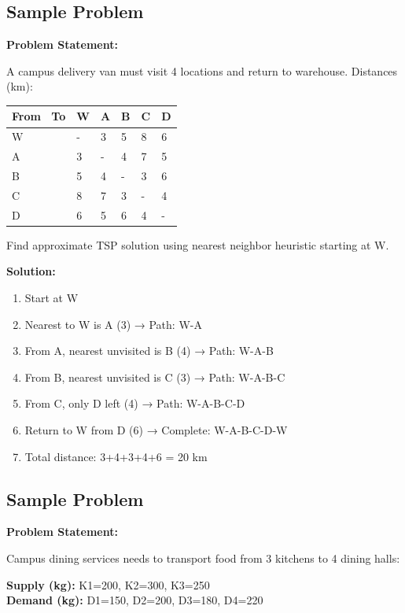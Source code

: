 \documentclass[
  letterpaper,
  DIV=11,
  numbers=noendperiod]{scrreprt}
\providecommand{\tightlist}{%
  \setlength{\itemsep}{0pt}\setlength{\parskip}{0pt}}
\begin{document}
\subsection{Sample Problem}\label{sample-problem-15}

\textbf{Problem Statement:}

A campus delivery van must visit 4 locations and return to warehouse.
Distances (km):

\begin{longtable}[]{@{}llllll@{}}
\toprule\noalign{}
From ~To & W & A & B & C & D \\
\midrule\noalign{}
\endhead
\bottomrule\noalign{}
\endlastfoot
W & - & 3 & 5 & 8 & 6 \\
A & 3 & - & 4 & 7 & 5 \\
B & 5 & 4 & - & 3 & 6 \\
C & 8 & 7 & 3 & - & 4 \\
D & 6 & 5 & 6 & 4 & - \\
\end{longtable}

Find approximate TSP solution using nearest neighbor heuristic starting
at W.

\textbf{Solution:}

\begin{enumerate}
\def\labelenumi{\arabic{enumi}.}
\tightlist
\item
  Start at W
\item
  Nearest to W is A (3) → Path: W-A
\item
  From A, nearest unvisited is B (4) → Path: W-A-B
\item
  From B, nearest unvisited is C (3) → Path: W-A-B-C
\item
  From C, only D left (4) → Path: W-A-B-C-D
\item
  Return to W from D (6) → Complete: W-A-B-C-D-W
\item
  Total distance: 3+4+3+4+6 = 20 km
\end{enumerate}

\subsection{Sample Problem}\label{sample-problem-16}

\textbf{Problem Statement:}

Campus dining services needs to transport food from 3 kitchens to 4
dining halls:

\textbf{Supply (kg):} K1=200, K2=300, K3=250\\
\textbf{Demand (kg):} D1=150, D2=200, D3=180, D4=220
\end{document}
